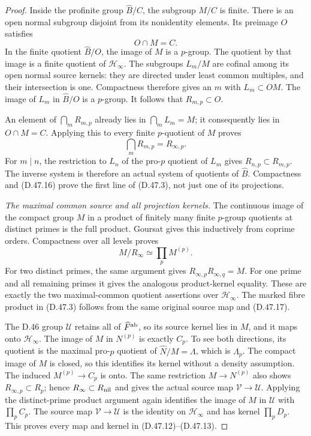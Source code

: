 \begin{proof}
Inside the profinite group
\(\widehat B/C\), the subgroup
\(M/C\) is finite. There is
an open normal subgroup
disjoint from its nonidentity
elements. Its preimage \(O\)
satisfies
\[
                       O\cap M=C .
\]
In the finite quotient
\(\widehat B/O\), the image
of \(M\) is a \(p\)-group.
The quotient by that image
is a finite quotient of
\(\mathcal H_\infty\).
The subgroups \(L_m/M\)
are cofinal among its open
normal source kernels:
they are directed under
least common multiples,
and their intersection
is one. Compactness
therefore gives an \(m\)
with \(L_m\subset OM\).
The image of \(L_m\)
in \(\widehat B/O\)
is a \(p\)-group.
It follows that
\(R_{m,p}\subset O\).

An element of
\(\bigcap_mR_{m,p}\)
already lies in
\(\bigcap_mL_m=M\);
it consequently lies
in \(O\cap M=C\).
Applying this to every
finite \(p\)-quotient
of \(M\) proves
\[
                  \bigcap_mR_{m,p}
                          =R_{\infty,p}.                     \tag{D.47.16}
\]
For \(m\mid n\),
the restriction to
\(L_n\) of the
pro-\(p\) quotient
of \(L_m\) gives
\(R_{n,p}\subset R_{m,p}\).
The inverse system is
therefore an actual
system of quotients
of \(\widehat B\).
Compactness and
(D.47.16) prove the
first line of
(D.47.3), not just
one of its projections.

\emph{The maximal common source and all projection kernels.}
The continuous image of
the compact group \(M\)
in a product of finitely
many finite \(p\)-group
quotients at distinct
primes is the full
product. Goursat gives
this inductively from
coprime orders.
Compactness over all
levels proves
\[
                 M/R_\infty\simeq\prod_pM^{(p)} .
                                                               \tag{D.47.17}
\]
For two distinct
primes, the same
argument gives
\(R_{\infty,p}
 R_{\infty,q}=M\).
For one prime and
all remaining primes
it gives the analogous
product-kernel equality.
These are exactly
the two maximal-common
quotient assertions
over \(\mathcal H_\infty\).
The marked fibre
product in (D.47.3)
follows from the
same original source
map and (D.47.17).

The D.46 group
\(\mathcal U\) retains
all of
\(\widehat F^{\rm ab}\),
so its source kernel
lies in \(M\), and
it maps onto
\(\mathcal H_\infty\).
The image of \(M\)
in \(N^{(p)}\) is
exactly \(C_p\).
To see both directions,
its quotient is the
maximal pro-\(p\)
quotient of
\(\widehat N/M=\Lambda\),
which is \(\Lambda_p\).
The compact image of
\(M\) is closed, so
this identifies its
kernel without a
density assumption.
The induced
\(M^{(p)}\to C_p\)
is onto. The same
restriction
\(M\to N^{(p)}\)
also shows
\(R_{\infty,p}\subset R_p\);
hence
\(R_\infty\subset R_{\rm nil}\)
and gives the actual
source map
\(\mathcal V\to\mathcal U\).
Applying
the distinct-prime
product argument
again identifies
the image of \(M\)
in \(\mathcal U\)
with \(\prod_pC_p\).
The source map
\(\mathcal V\to\mathcal U\)
is the identity on
\(\mathcal H_\infty\)
and has kernel
\(\prod_pD_p\).
This proves every
map and kernel in
(D.47.12)--(D.47.13).


\end{proof}
